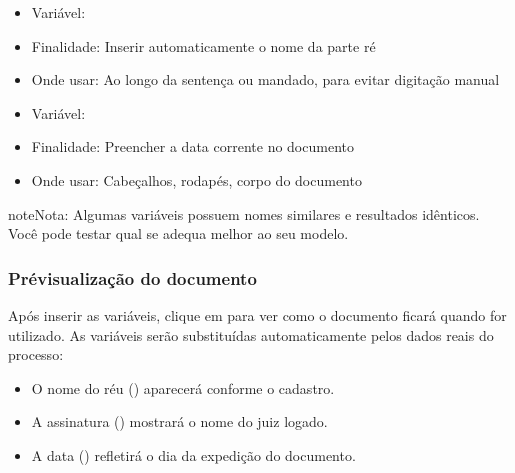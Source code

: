 \documentclass[letterpaper,10pt,brazil]{sphinxmanual}
\begin{document}
\sphinxAtStartPar
{}
\begin{itemize}
\item {} 
\sphinxAtStartPar
Variável: 

\item {} 
\sphinxAtStartPar
Finalidade: Inserir automaticamente o nome da parte ré

\item {} 
\sphinxAtStartPar
Onde usar: Ao longo da sentença ou mandado, para evitar digitação manual

\end{itemize}

\sphinxAtStartPar
{}
\begin{itemize}
\item {} 
\sphinxAtStartPar
Variável: 

\item {} 
\sphinxAtStartPar
Finalidade: Preencher a data corrente no documento

\item {} 
\sphinxAtStartPar
Onde usar: Cabeçalhos, rodapés, corpo do documento

\end{itemize}

\begin{sphinxadmonition}{note}{Nota:}
\sphinxAtStartPar
Algumas variáveis possuem nomes similares e resultados idênticos. Você pode testar qual se adequa melhor ao seu modelo.
\end{sphinxadmonition}


\subsubsection{Pré\sphinxhyphen{}visualização do documento}
\label{\detokenize{projud_49_variaveis:pre-visualizacao-do-documento}}
\sphinxAtStartPar
Após inserir as variáveis, clique em  para ver como o documento ficará quando for utilizado. As variáveis serão substituídas automaticamente pelos dados reais do processo:
\begin{itemize}
\item {} 
\sphinxAtStartPar
O nome do réu () aparecerá conforme o cadastro.

\item {} 
\sphinxAtStartPar
A assinatura () mostrará o nome do juiz logado.

\item {} 
\sphinxAtStartPar
A data () refletirá o dia da expedição do documento.

\end{itemize}
\end{document}
